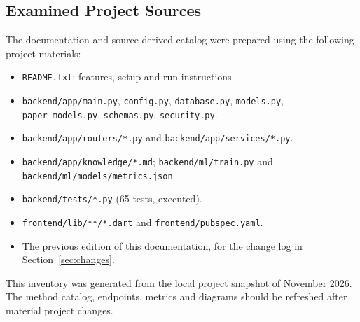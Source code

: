 \subsection{Examined Project Sources}
The documentation and source-derived catalog were prepared using the following project materials:
\begin{itemize}
\item \texttt{README.txt}: features, setup and run instructions.
\item \texttt{backend/app/main.py}, \texttt{config.py}, \texttt{database.py}, \texttt{models.py}, \texttt{paper\_models.py}, \texttt{schemas.py}, \texttt{security.py}.
\item \texttt{backend/app/routers/*.py} and \texttt{backend/app/services/*.py}.
\item \texttt{backend/app/knowledge/*.md}; \texttt{backend/ml/train.py} and \texttt{backend/ml/models/metrics.json}.
\item \texttt{backend/tests/*.py} (65 tests, executed).
\item \texttt{frontend/lib/**/*.dart} and \texttt{frontend/pubspec.yaml}.
\item The previous edition of this documentation, for the change log in Section~\ref{sec:changes}.
\end{itemize}
This inventory was generated from the local project snapshot of November 2026. The method catalog, endpoints, metrics and diagrams should be refreshed after material project changes.
